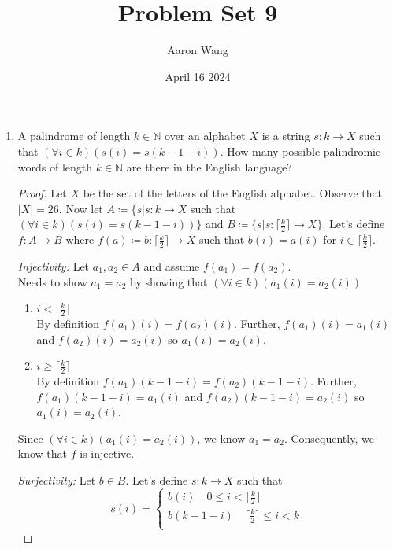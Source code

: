 \documentclass{article}
\title{Problem Set 9}
\author{Aaron Wang}
\date{April 16 2024}
\newcommand{\defeq}{\coloneqq}
\newcommand{\naturals}{\mathbb{N}}
\newcommand{\ceil}[1]{\lceil {#1} \rceil}
\newenvironment{case}[1][Case]
    {\par\textit{#1:}\hfill\break}
    {}
\begin{document}
\maketitle

\begin{enumerate}
    \item
    A palindrome of length $k \in \naturals$ over an alphabet $X$ is a string $s: k \to X$ such that $(\forall i \in k)(s(i) = s(k - 1 - i))$.
    How many possible palindromic words of length $k \in \naturals$ are there in the English language?
    \begin{proof}
        Let $X$ be the set of the letters of the English alphabet. Observe that $|X|=26$. Now let $A \defeq \{s|s:k \to X$ such that $(\forall i \in k)(s(i) = s(k - 1 - i))\}$ and $B \defeq \{s|s:\ceil{\frac{k}{2}} \to X\}$. Let's define $f:A \to B$ where $f(a) \defeq b:\ceil{\frac{k}{2}} \to X$ such that $b(i)=a(i) $ for $ i \in \ceil{\frac{k}{2}}$.\\
        \begin{case}[Injectivity]
            Let $a_1,a_2 \in A$ and assume $f(a_1)=f(a_2)$.\\ 
            Needs to show $a_1=a_2$ by showing that $(\forall i \in k)(a_1(i)=a_2(i))$
            \begin{enumerate}
                \item[] $i < \ceil{\frac{k}{2}}$\\
                By definition $f(a_1)(i)=f(a_2)(i)$. Further, $f(a_1)(i)=a_1(i)$ and $f(a_2)(i)=a_2(i)$ so $a_1(i)=a_2(i)$.
                \item[] $i \geq \ceil{\frac{k}{2}}$\\
                By definition $f(a_1)(k-1-i)=f(a_2)(k-1-i)$. Further, $f(a_1)(k-1-i)=a_1(i)$ and $f(a_2)(k-1-i)=a_2(i)$ so $a_1(i)=a_2(i)$.
            \end{enumerate}
            Since $(\forall i \in k)(a_1(i)=a_2(i))$, we know $a_1=a_2$. Consequently, we know that $f$ is injective.
        \end{case}
        \begin{case}[Surjectivity]
            Let $b \in B$. Let's define $s:k \to X$ such that
            \[s(i)=
            \begin{cases}
                b(i) \quad 0 \leq i < \ceil{\frac{k}{2}}\\
                b(k-1-i) \quad \ceil{\frac{k}{2}} \leq i < k\\
            \end{cases}
\]
\end{case}
\end{proof}
\end{enumerate}
\end{document}
